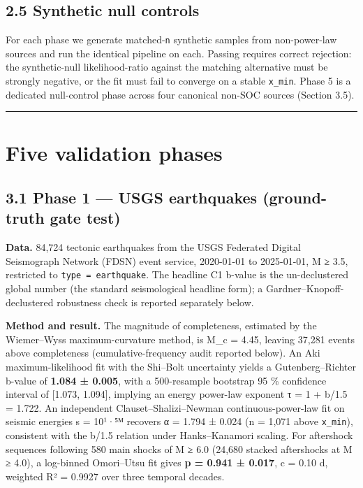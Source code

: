 \documentclass[
  11pt]{article}
\begin{document}
\subsection{2.5 Synthetic null
controls}\label{25-synthetic-null-controls}

For each phase we generate matched-\texttt{n} synthetic samples from
non-power-law sources and run the identical pipeline on each. Passing
requires correct rejection: the synthetic-null likelihood-ratio against
the matching alternative must be strongly negative, or the fit must fail
to converge on a stable \texttt{x\_min}. Phase 5 is a dedicated
null-control phase across four canonical non-SOC sources (Section 3.5).

\begin{center}\rule{0.5\linewidth}{0.5pt}\end{center}

\section{Five validation phases}\label{sec:3}

\subsection{3.1 Phase 1 --- USGS earthquakes (ground-truth gate
test)}\label{31-phase-1--usgs-earthquakes-ground-truth-gate-test}

\textbf{Data.} 84,724 tectonic earthquakes from the USGS Federated
Digital Seismograph Network (FDSN) event service, 2020-01-01 to
2025-01-01, M ≥ 3.5, restricted to \texttt{type\ =\ earthquake}. The
headline C1 b-value is the un-declustered global number (the standard
seismological headline form); a Gardner--Knopoff-declustered robustness
check is reported separately below.

\textbf{Method and result.} The magnitude of completeness, estimated by
the Wiemer--Wyss maximum-curvature method, is M\_c = 4.45, leaving
37,281 events above completeness (cumulative-frequency audit reported
below). An Aki maximum-likelihood fit with the Shi--Bolt uncertainty
yields a Gutenberg--Richter b-value of \textbf{1.084 ± 0.005}, with a
500-resample bootstrap 95 \% confidence interval of {[}1.073, 1.094{]},
implying an energy power-law exponent τ = 1 + b/1.5 = 1.722. An
independent Clauset--Shalizi--Newman continuous-power-law fit on seismic
energies s = 10¹·⁵ᴹ recovers α = 1.794 ± 0.024 (n = 1,071 above
\texttt{x\_min}), consistent with the b/1.5 relation under
Hanks--Kanamori scaling. For aftershock sequences following 580 main
shocks of M ≥ 6.0 (24,680 stacked aftershocks at M ≥ 4.0), a log-binned
Omori--Utsu fit gives \textbf{p = 0.941 ± 0.017}, c = 0.10 d, weighted
R² = 0.9927 over three temporal decades.
\end{document}
